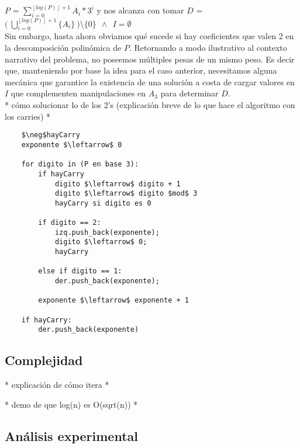 	$P$ = $\sum_{i = 0}^{\left \lfloor{log(P)}\right \rfloor + 1} A_i*3^{i}$ y nos alcanza con tomar $D$ = $\bigl ( \ \bigcup_{i=0}^{\left \lfloor{log(P)}\right \rfloor + 1} \{A_i\} \ \bigr ) \setminus \{0\} \ \ \wedge \ \ I = \emptyset $
	\\
	
	Sin embargo, hasta ahora obviamos qué sucede si hay coeficientes que valen 2 en la descomposición polinómica de $P$. Retornando a modo ilustrativo al contexto narrativo del problema, no poseemos múltiples pesas de un mismo peso. Es decir que, manteniendo por base la idea para el caso anterior, necesitamos alguna mecánica que garantice la existencia de una solución a costa de cargar valores en $I$ que complementen manipulaciones en $A_3$ para determinar $D$. 
	\\
	
	* cómo solucionar lo de los 2's (explicación breve de lo que hace el algoritmo con los carries) * 
	\\
	
\lstset{basicstyle=\large}
\begin{lstlisting}
    $\neg$hayCarry
    exponente $\leftarrow$ 0

    for digito in (P en base 3):
        if hayCarry
            digito $\leftarrow$ digito + 1
            digito $\leftarrow$ digito $mod$ 3
            hayCarry si digito es 0

        if digito == 2:
            izq.push_back(exponente);
            digito $\leftarrow$ 0;
            hayCarry

        else if digito == 1:
            der.push_back(exponente);
        
        exponente $\leftarrow$ exponente + 1
    
    if hayCarry:
        der.push_back(exponente)

\end{lstlisting}


\subsection{Complejidad}
	* explicación de cómo itera *

	* demo de que log(n) es O(sqrt(n)) *

\subsection{Análisis experimental}
